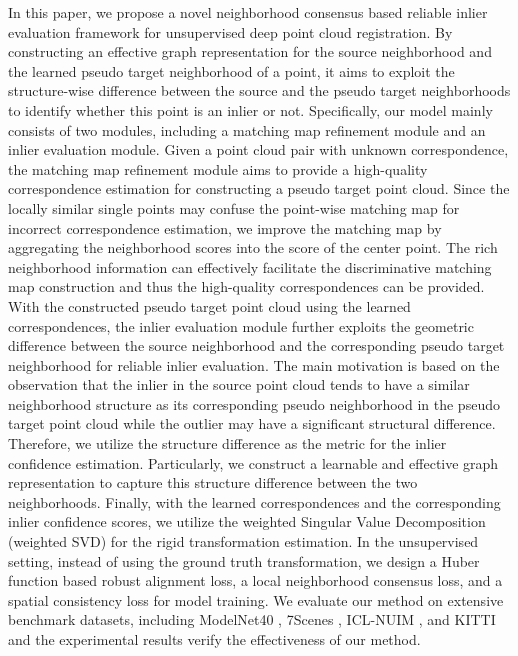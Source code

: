 \documentclass[letterpaper]{article} %
\begin{document}
	In this paper, we propose a novel neighborhood consensus based reliable inlier evaluation framework for unsupervised deep point cloud registration.
	By constructing an effective graph representation for the source neighborhood and the learned pseudo target neighborhood of a point, it aims to exploit the structure-wise difference between the source and the pseudo target neighborhoods to identify whether this point is an inlier or not.
	Specifically, our model mainly consists of two modules, including a matching map refinement module and an inlier evaluation module.
	Given a point cloud pair with unknown correspondence, the matching map refinement module aims to provide a high-quality correspondence estimation for constructing a pseudo target point cloud.
	Since the locally similar single points may confuse the point-wise matching map for incorrect correspondence estimation, we improve the matching map by aggregating the neighborhood scores into the score of the center point.
	The rich neighborhood information can effectively facilitate the discriminative matching map construction and thus the high-quality correspondences can be provided.
	With the constructed pseudo target point cloud using the learned correspondences, the inlier evaluation module further exploits the geometric difference between the source neighborhood and the corresponding pseudo target neighborhood for reliable inlier evaluation.
	The main motivation is based on the observation that the inlier in the source point cloud tends to have a similar neighborhood structure as its corresponding pseudo neighborhood in the pseudo target point cloud while the outlier may have a significant structural difference. Therefore, we utilize the structure difference as the metric for the inlier confidence estimation.
	Particularly, we construct a learnable and effective graph representation to capture this structure difference between the two neighborhoods.
	Finally, with the learned correspondences and the corresponding inlier confidence scores, we utilize the weighted Singular Value Decomposition (weighted SVD) for the rigid transformation estimation.
	In the unsupervised setting, instead of using the ground truth transformation, we design a Huber function based robust alignment loss, a local neighborhood consensus loss, and a spatial consistency loss for model training.
	We evaluate our method on extensive benchmark datasets, including ModelNet40 \cite{wu20153d}, 7Scenes \cite{shotton2013scene}, ICL-NUIM \cite{choi2015robust}, and KITTI \cite{geiger2012we} and the experimental results verify the effectiveness of our method.
\end{document}
